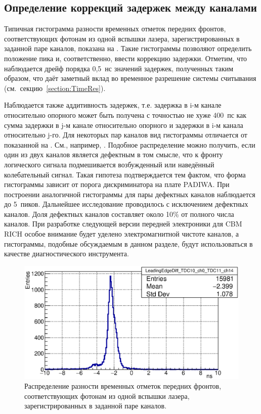 \subsection{Определение коррекций задержек между каналами}\label{section:Corrections}

Типичная гистограмма разности временных отметок передних фронтов, соответствующих фотонам из одной вспышки лазера, зарегистрированных в заданной паре каналов, показана на . Такие гистограммы позволяют определить положение пика и, соответственно, ввести коррекцию задержки. Отметим, что наблюдается дрейф порядка 0,5~нс значений задержек, полученных таким образом, что даёт заметный вклад во временное разрешение системы считывания (см.~секцию~\ref{section:TimeRes}).

Наблюдается также аддитивность задержек, т.е. задержка в i-м канале относительно опорного может быть получена с точностью не хуже 400~пс как сумма задержки в j-м канале относительно опорного и задержки в i-м канала относительно j-го. Для некоторых пар каналов вид гистограммы отличается от показанной на . См., например, . Подобное распределение можно получить, если один из двух каналов является дефектным в том смысле, что к фронту логического сигнала подмешивается возбужденный или наведённый колебательный сигнал. Такая гипотеза подтверждается тем фактом, что форма гистограммы зависит от порога дискриминатора на плате PADIWA. При построении аналогичной гистограммы для пары дефектных каналов наблюдается до 5~пиков. Дальнейшее исследование проводилось с исключением дефектных каналов. Доля дефектных каналов составляет около 10\% от полного числа каналов. При разработке следующей версии передней электроники для CBM RICH особое внимание будет уделено электромагнитной чистоте каналов, а гистограммы, подобные обсуждаемым в данном разделе, будут использоваться в качестве диагностического инструмента.

\begin{figure}[H]
\centering
\includegraphics[width=1.0\textwidth]{pictures/22_LeadingEdgeDiff_TDC10_ch0_TDC11_ch14_feb2017.eps}
\caption{Распределение разности временных отметок передних фронтов, соответствующих фотонам из одной вспышки лазера, зарегистрированных в заданной паре каналов.}
\label{fig:TypicalLeadingEdgeDiff}
\end{figure}

